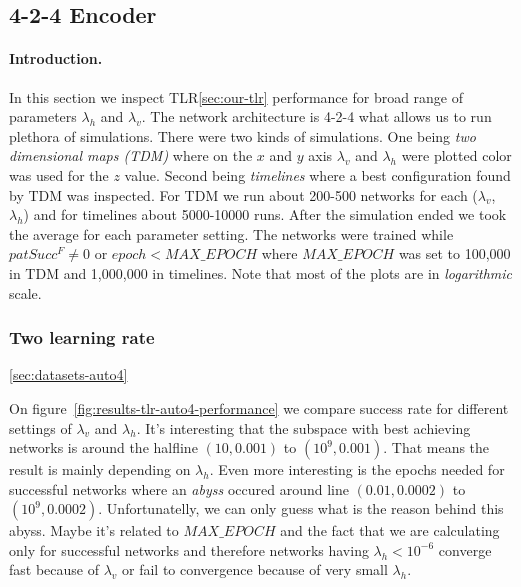 

\subsection{4-2-4 Encoder} 
\label{sec:results-auto4} 

\paragraph{Introduction.} 
In this section we inspect TLR\ref{sec:our-tlr} performance for broad range of parameters $\lambda_h$ and $\lambda_v$. The network architecture is 4-2-4 what allows us to run plethora of simulations. There were two kinds of simulations. One being \emph{two dimensional maps (TDM)} where on the $x$ and $y$ axis $\lambda_v$ and $\lambda_h$ were plotted color was used for the $z$ value. Second being \emph{timelines} where a best configuration found by TDM was inspected. For TDM we run about 200-500 networks for each ($\lambda_v$, $\lambda_h$) and for timelines about 5000-10000 runs. After the simulation ended we took the average for each parameter setting. The networks were trained while $patSucc^F \neq 0$ or $epoch < MAX\_EPOCH$ where $MAX\_EPOCH$ was set to 100,000 in TDM and 1,000,000 in timelines. Note that most of the plots are in \emph{logarithmic} scale. 

 

\subsubsection{Two learning rate} 
\label{sec:tlr-auto4} 
\ref{sec:datasets-auto4} 

On figure~\ref{fig:results-tlr-auto4-performance} we compare success rate for different settings of $\lambda_v$ and $\lambda_h$. It's interesting that the subspace with best achieving networks is around the halfline $(10, 0.001)$ to $(10^9, 0.001)$. That means the result is mainly depending on $\lambda_h$. Even more interesting is the epochs needed for successful networks where an \emph{abyss} occured around line $(0.01, 0.0002)$ to $(10^9, 0.0002)$. Unfortunatelly, we can only guess what is the reason behind this abyss. Maybe it's related to $MAX\_EPOCH$ and the fact that we are calculating only for successful networks and therefore networks having $\lambda_h < 10^{-6}$ converge fast because of $\lambda_v$ or fail to convergence because of very small $\lambda_h$. 

